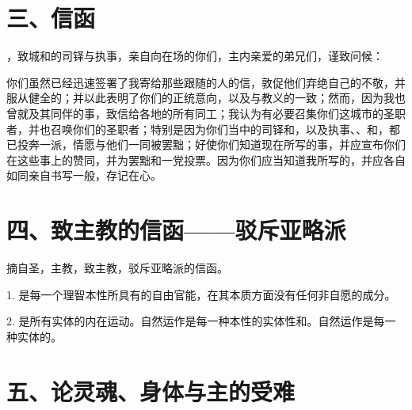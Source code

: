 
\section{三、信函}

，致城和的司铎与执事，亲自向在场的你们，主内亲爱的弟兄们，谨致问候：\par

你们虽然已经迅速签署了我寄给那些跟随的人的信，敦促他们弃绝自己的不敬，并服从健全的；并以此表明了你们的正统意向，以及与教义的一致；然而，因为我也曾就及其同伴的事，致信给各地的所有同工；我认为有必要召集你们这城市的圣职者，并也召唤你们的圣职者；特别是因为你们当中的司铎和，以及执事、、和，都已投奔一派，情愿与他们一同被罢黜；好使你们知道现在所写的事，并应宣布你们在这些事上的赞同，并为罢黜和一党投票。因为你们应当知道我所写的，并应各自如同亲自书写一般，存记在心。\par


\section{四、致主教的信函——驳斥亚略派}

摘自圣，主教，致主教，驳斥亚略派的信函。\par

1. 是每一个理智本性所具有的自由官能，在其本质方面没有任何非自愿的成分。\par

2. 是所有实体的内在运动。自然运作是每一种本性的实体性和。自然运作是每一种实体的。\par


\section{五、论灵魂、身体与主的受难}

